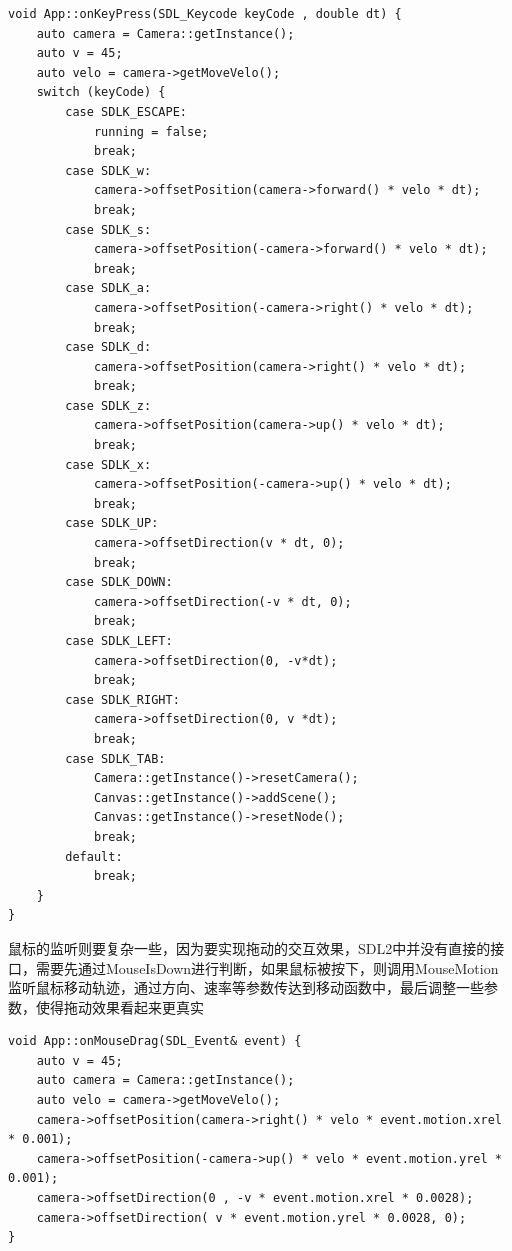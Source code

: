 \begin{lstlisting}
void App::onKeyPress(SDL_Keycode keyCode , double dt) {
    auto camera = Camera::getInstance();
    auto v = 45;
    auto velo = camera->getMoveVelo();
    switch (keyCode) {
        case SDLK_ESCAPE:
            running = false;
            break;
        case SDLK_w:
            camera->offsetPosition(camera->forward() * velo * dt);
            break;
        case SDLK_s:
            camera->offsetPosition(-camera->forward() * velo * dt);
            break;
        case SDLK_a:
            camera->offsetPosition(-camera->right() * velo * dt);
            break;
        case SDLK_d:
            camera->offsetPosition(camera->right() * velo * dt);
            break;
        case SDLK_z:
            camera->offsetPosition(camera->up() * velo * dt);
            break;
        case SDLK_x:
            camera->offsetPosition(-camera->up() * velo * dt);
            break;
        case SDLK_UP:
            camera->offsetDirection(v * dt, 0);
            break;
        case SDLK_DOWN:
            camera->offsetDirection(-v * dt, 0);
            break;
        case SDLK_LEFT:
            camera->offsetDirection(0, -v*dt);
            break;
        case SDLK_RIGHT:
            camera->offsetDirection(0, v *dt);
            break;
        case SDLK_TAB:
            Camera::getInstance()->resetCamera();
            Canvas::getInstance()->addScene();
            Canvas::getInstance()->resetNode();
            break;
        default:
            break;
    }
}
\end{lstlisting}

	\begin{spacing}{2.5}
			鼠标的监听则要复杂一些，因为要实现拖动的交互效果，SDL2中并没有直接的接口，需要先通过MouseIsDown进行判断，如果鼠标被按下，则调用MouseMotion监听鼠标移动轨迹，通过方向、速率等参数传达到移动函数中，最后调整一些参数，使得拖动效果看起来更真实
	\end{spacing}

\begin{lstlisting}
void App::onMouseDrag(SDL_Event& event) {
    auto v = 45;
    auto camera = Camera::getInstance();
    auto velo = camera->getMoveVelo();
    camera->offsetPosition(camera->right() * velo * event.motion.xrel * 0.001);
    camera->offsetPosition(-camera->up() * velo * event.motion.yrel * 0.001);
    camera->offsetDirection(0 , -v * event.motion.xrel * 0.0028);
    camera->offsetDirection( v * event.motion.yrel * 0.0028, 0);
}
\end{lstlisting}

